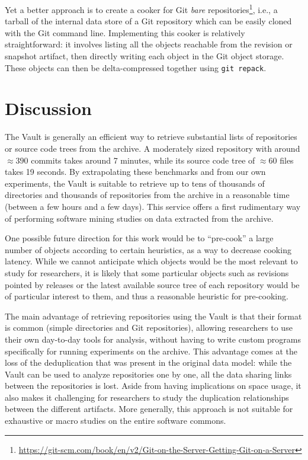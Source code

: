 Yet a better approach is to create a cooker for Git \emph{bare}
repositories\footnote{\url{https://git-scm.com/book/en/v2/Git-on-the-Server-Getting-Git-on-a-Server}},
i.e., a tarball of the internal data store of a Git repository which can be
easily cloned with the Git command line. Implementing this cooker is relatively
straightforward: it involves listing all the objects reachable from the
revision or snapshot artifact, then directly writing each object in the Git
object storage. These objects can then be delta-compressed together using
\texttt{git repack}.

\section{Discussion}

The Vault is generally an efficient way to retrieve substantial lists of
repositories or source code trees from the archive. A moderately sized
repository with around $\approx390$ commits takes around 7 minutes, while its
source code tree of $\approx60$ files takes 19 seconds. By extrapolating these
benchmarks and from our own experiments, the Vault is suitable to retrieve up
to tens of thousands of directories and thousands of repositories from the
archive in a reasonable time (between a few hours and a few days). This service
offers a first rudimentary way of performing software mining studies on data
extracted from the archive.

One possible future direction for this work would be to ``pre-cook'' a large
number of objects according to certain heuristics, as a way to decrease cooking
latency. While we cannot anticipate which objects would be the most relevant to
study for researchers, it is likely that some particular objects such as
revisions pointed by releases or the latest available source tree of each
repository would be of particular interest to them, and thus a reasonable
heuristic for pre-cooking.

The main advantage of retrieving repositories using the Vault is that their
format is common (simple directories and Git repositories), allowing
researchers to use their own day-to-day tools for analysis, without having to
write custom programs specifically for running experiments on the archive. This
advantage comes at the loss of the deduplication that was present in the
original data model: while the Vault can be used to analyze repositories one by
one, all the data sharing links between the repositories is lost. Aside from
having implications on space usage, it also makes it challenging for
researchers to study the duplication relationships between the different
artifacts. More generally, this approach is not suitable for exhaustive or
macro studies on the entire software commons.

